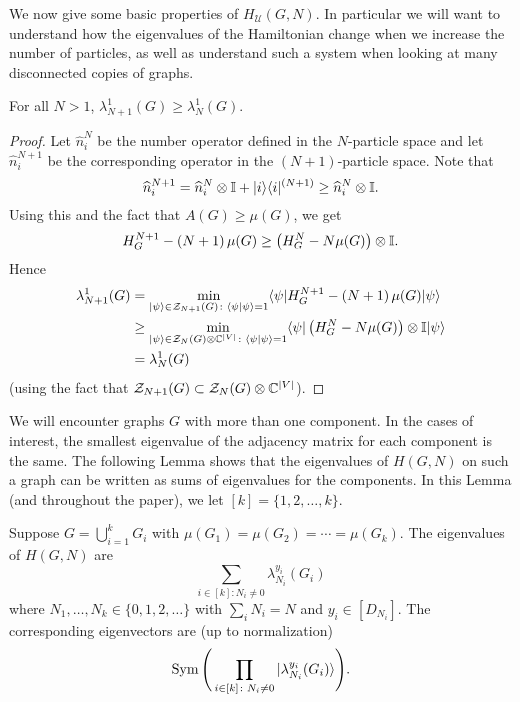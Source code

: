 \documentclass[../thesis-main/thesis-main]{subfiles}
\begin{document}
We now give some basic properties of $H_{\mathcal{U}}(G,N)$.  In particular we will want to understand how the eigenvalues of the Hamiltonian change when we increase the number of particles, as well as understand such a system when looking at many disconnected copies of graphs.

\begin{lemma}
  For all $N>1$, $\lambda_{N+1}^1(G) \geq \lambda_{N}^1(G)$.
\end{lemma}
\begin{proof}
Let $\widehat{n}_{i}^{N}$ be the number operator  defined in the $N$-particle space and let $\widehat{n}_{i}^{N+1}$ be the corresponding operator in the $\left(N+1\right)$-particle space. Note that
\[
\widehat{n}_{i}^{N+1} = \widehat{n}_{i}^{N}\otimes\mathbb{I}+|i\rangle\langle i|^{(N+1)} \geq \widehat{n}_{i}^{N}\otimes\mathbb{I}.
\]
Using this and the fact that $A(G)\geq\mu(G)$, we get 
\[
H_{G}^{N+1}-\left(N+1\right)\mu(G)\geq\left(H_{G}^{N}-N\mu(G)\right)\otimes\mathbb{I}.
\]
Hence 
\begin{align*}
\lambda_{N+1}^{1}(G) & =\min_{|\psi\rangle\in\mathcal{Z}_{N+1}(G)\colon \langle\psi|\psi\rangle=1}\langle\psi|H_{G}^{N+1}-\left(N+1\right)\mu(G)|\psi\rangle\\
 & \geq\min_{|\psi\rangle\in\mathcal{Z}_{N}(G)\otimes\mathbb{C}^{|V|}\colon \langle\psi|\psi\rangle=1}\langle\psi|\left(H_{G}^{N}-N\mu(G)\right)\otimes\mathbb{I} |\psi\rangle\\
 & =\lambda_{N}^{1}(G)
\end{align*}
(using the fact that $\mathcal{Z}_{N+1}(G)\subset\mathcal{Z}_{N}(G)\otimes\mathbb{C}^{|V|}$). 
\end{proof}
We will encounter graphs $G$ with more than one component. In the cases of interest, the smallest eigenvalue of the adjacency matrix for each component is the same. The following Lemma shows that the eigenvalues of $H(G,N)$ on such a graph can be written as sums of eigenvalues for the components. In this Lemma (and throughout the paper), we let $[k] = \{1,2,\ldots,k\}$.

\begin{lemma}
\label{lem:BH_disconnected_graphs}
Suppose $G=\bigcup_{i=1}^{k}G_{i}$ with $\mu(G_{1})=\mu(G_{2})=\cdots=\mu(G_{k})$. The eigenvalues of $H(G,N)$ are 
\[
\sum_{i\in[k]\colon N_{i}\neq0}\lambda_{N_{i}}^{y_{i}}(G_{i})
\]
where $N_{1},\ldots,N_{k}\in\{0,1,2,\ldots\}$ with $\sum_{i}N_{i}=N$ and $y_{i}\in[D_{N_{i}}].$ The corresponding eigenvectors are (up to normalization) 
\begin{equation}
\operatorname{Sym}\Bigg(\prod_{i\in[k]\colon N_{i}\neq0}|\lambda_{N_{i}}^{y_{i}}(G_{i})\rangle\Bigg).
\label{eq:eigvecs_disconnected}
\end{equation}
\end{lemma}
\end{document}
